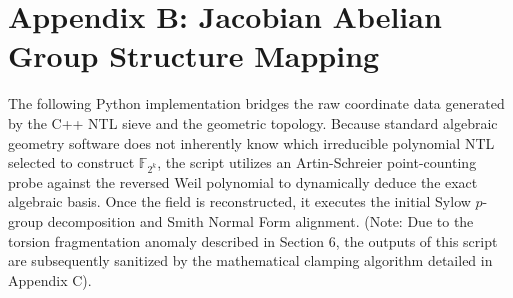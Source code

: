 \documentclass[letterpaper, 11pt]{article}
\begin{document}
	\section{Appendix B: Jacobian Abelian Group Structure Mapping}
	The following Python implementation bridges the raw coordinate data generated by the C++ NTL sieve and the geometric topology. Because standard algebraic geometry software does not inherently know which irreducible polynomial NTL selected to construct $\mathbb{F}_{2^k}$, the script utilizes an Artin-Schreier point-counting probe against the reversed Weil polynomial to dynamically deduce the exact algebraic basis. Once the field is reconstructed, it executes the initial Sylow $p$-group decomposition and Smith Normal Form alignment. (Note: Due to the torsion fragmentation anomaly described in Section 6, the outputs of this script are subsequently sanitized by the mathematical clamping algorithm detailed in Appendix C).
	
\end{document}
